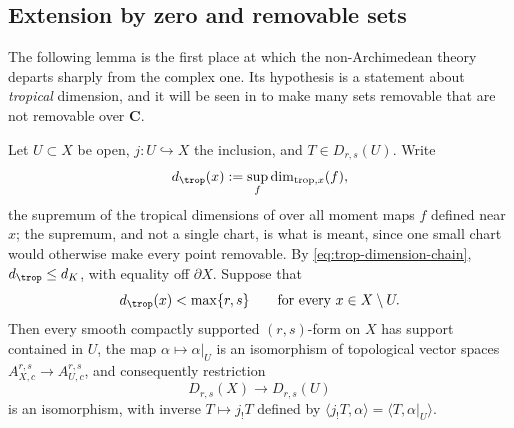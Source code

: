 \subsection{Extension by zero and removable sets}
\label{sec:ch14-extension}

The following lemma is the first place at which the non-Archimedean theory
departs sharply from the complex one.  Its hypothesis is a statement about
\emph{tropical} dimension, and it will be seen in
 to make many sets removable that are not removable
over $\mathbf C$.

\begin{lemma}
\label{lem:ch14-extension-by-zero}
Let $U\subset X$ be open, $j:U\hookrightarrow X$ the inclusion, and
$T\in D_{r,s}(U)$.  Write
\[
 d_{\trop}(x):=\sup_f\dim_{\mathrm{trop},x}(f),
\]
the supremum of the tropical dimensions of
 over all moment maps $f$ defined near
$x$; the supremum, and not a single chart, is what is meant, since one small
chart would otherwise make every point removable.  By
\eqref{eq:trop-dimension-chain}, $d_{\trop}\le d_K$, with equality off
$\partial X$.  Suppose that
\[
 d_{\trop}(x)<\max\{r,s\}\qquad\text{for every }x\in X\setminus U .
\]
Then every smooth compactly supported $(r,s)$-form on $X$ has support
contained in $U$, the map $\alpha\mapsto\alpha|_U$ is an isomorphism of
topological vector spaces $A_{X,c}^{r,s}\to A_{U,c}^{r,s}$, and consequently
restriction
\[
 D_{r,s}(X)\longrightarrow D_{r,s}(U)
\]
is an isomorphism, with inverse $T\mapsto j_!T$ defined by
$\langle j_!T,\alpha\rangle=\langle T,\alpha|_U\rangle$.
\end{lemma}

